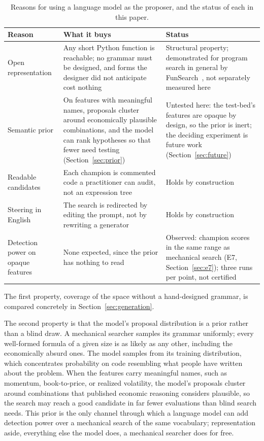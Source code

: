 \documentclass[11pt]{article}
\begin{document}
\begin{table}[htbp]
\centering
\caption{Reasons for using a language model as the proposer, and the status of each in this paper.}
\label{tab:whyllm}
\small
\begin{tabular}{p{3.4cm} p{5.3cm} p{5.3cm}}
\toprule
Reason & What it buys & Status \\
\midrule
Open representation & Any short Python function is reachable; no grammar must be designed, and forms
the designer did not anticipate cost nothing & Structural property; demonstrated for program search in
general by FunSearch~\cite{funsearch}, not separately measured here \\
\addlinespace
Semantic prior & On features with meaningful names, proposals cluster around economically plausible
combinations, and the model can rank hypotheses so that fewer need testing
(Section~\ref{sec:prior}) & Untested here: the test-bed's features are opaque by
design, so the prior is inert; the deciding experiment is future work (Section~\ref{sec:future}) \\
\addlinespace
Readable candidates & Each champion is commented code a practitioner can audit, not an expression
tree & Holds by construction \\
\addlinespace
Steering in English & The search is redirected by editing the prompt, not by rewriting a
generator & Holds by construction \\
\addlinespace
Detection power on opaque features & None expected, since the prior has nothing to read & Observed:
champion scores in the same range as mechanical search (E7, Section~\ref{sec:e7}); three runs per
point, not certified \\
\bottomrule
\end{tabular}
\end{table}

The first property, coverage of the space without a hand-designed grammar, is compared concretely in
Section~\ref{sec:generation}.

The second property is that the model's proposal distribution is a prior rather than a blind draw. A
mechanical searcher samples its grammar uniformly; every well-formed formula of a given size is as
likely as any other, including the economically absurd ones. The model samples from its training
distribution, which concentrates probability on code resembling what people have written about the
problem. When the features carry meaningful names, such as momentum, book-to-price, or realized
volatility, the model's proposals cluster around combinations that published economic reasoning
considers plausible, so the search may reach a good candidate in far fewer evaluations than blind
search needs. This prior is the only channel through which a language model can add detection power
over a mechanical search of the same vocabulary; representation aside, everything else the model does,
a mechanical searcher does for free.
\end{document}

